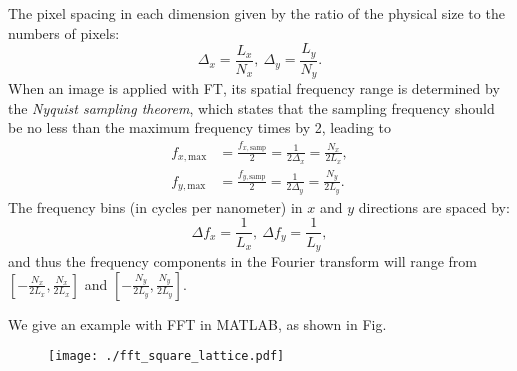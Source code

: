 \documentclass[pra,superscriptaddress,reprint]{revtex4-1}
\begin{document}
The pixel spacing in each dimension given by the ratio of the physical size to the numbers of pixels:
\begin{equation}
\Delta_x = \frac{L_x}{N_x},~\Delta_y = \frac{L_y}{N_y}.
\end{equation}
When  an image is applied with FT, its spatial frequency range is determined by the \textit{Nyquist sampling theorem},
which states that the sampling frequency should be no less than the maximum frequency times by 2, leading to
\begin{subequations}
\begin{align}
f_{x,\text{max}} &= \frac{f_{x,\text{samp}}}{2} = \frac{1}{2\Delta_x} = \frac{N_x}{2L_x}, \\
f_{y,\text{max}} &= \frac{f_{y,\text{samp}}}{2} = \frac{1}{2\Delta_y} = \frac{N_y}{2L_y}.
\end{align}
\end{subequations}
The frequency bins (in cycles per nanometer) in $x$ and $y$ directions are spaced by:
\begin{equation}
\Delta f_x = \frac{1}{L_x},~\Delta f_y = \frac{1}{L_y},
\end{equation}
and thus the frequency components in the Fourier transform will range from 
$[-\frac{N_x}{2L_x}, \frac{N_x}{2L_x}]$ and $[-\frac{N_y}{2L_y}, \frac{N_y}{2L_y}]$.

We give an example with FFT in MATLAB, as shown in Fig.

\begin{figure}[t]
\centering
\texttt{[image: ./fft\_square\_lattice.pdf]}\\
\caption{\label{fig:square_lattice}}
\end{figure}
\end{document}
